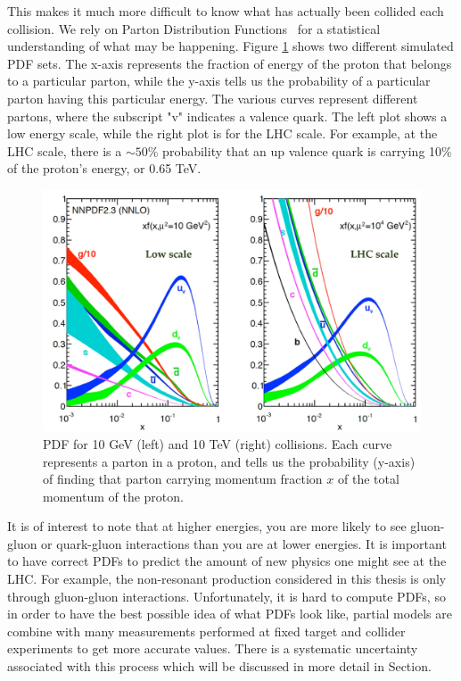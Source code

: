 This makes it much more difficult to know what has actually been collided each collision. We rely on Parton Distribution Functions~\cite{Bourilkov:2006cj,Ball:2014uwa} for a statistical understanding of what may be happening. Figure \ref{Fig:Detect:PDFset} shows two different simulated PDF sets. The x-axis represents the fraction of energy of the proton that belongs to a particular parton, while the y-axis tells us the probability of a particular parton having this particular energy. The various curves represent different partons, where the subscript "v" indicates a valence quark. The left plot shows a low energy scale, while the right plot is for the LHC scale. For example, at the LHC scale, there is a $\sim50$\% probability that an up valence quark is carrying 10\% of the proton's energy, or 0.65 TeV. 
\begin{figure}[h!]
    \centering
        \includegraphics[width=\textwidth]{F3/PDFset}
        \caption{PDF for 10 GeV (left) and 10 TeV (right) collisions. Each curve represents a parton in a proton, and tells us the probability (y-axis) of finding that parton carrying momentum fraction $x$ of the total momentum of the proton.}
        \label{Fig:Detect:PDFset}
\end{figure}
It is of interest to note that at higher energies, you are more likely to see gluon-gluon or quark-gluon interactions than you are at lower energies. It is important to have correct PDFs to predict the amount of new physics one might see at the LHC. For example, the non-resonant production considered in this thesis is only through gluon-gluon interactions. Unfortunately, it is hard to compute PDFs, so in order to have the best possible idea of what PDFs look like, partial models are combine with many measurements performed at fixed target and collider experiments to get more accurate values. There is a systematic uncertainty associated with this process which will be discussed in more detail in Section.

